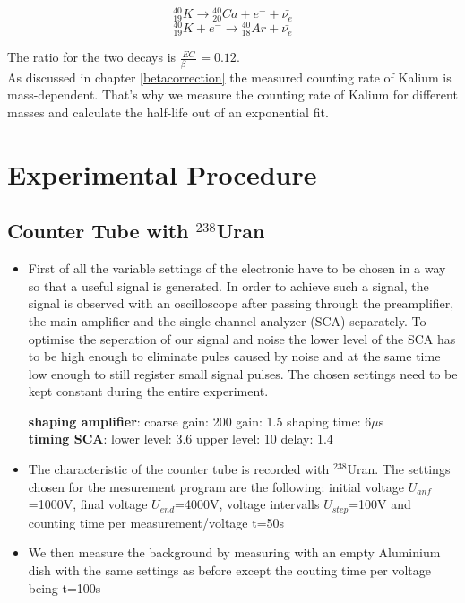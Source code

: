 \documentclass[12pt]{article}
\begin{document}
\[{}^{40}_{19}K \rightarrow {}^{40}_{20}Ca + e^- + \bar{\nu_e}\]
\[{}^{40}_{19}K + e^- \rightarrow {}^{40}_{18}Ar + \bar{\nu_e}\]

The ratio for the two decays is $\frac{EC}{\beta-}=0.12$.\\

As discussed in chapter \ref{betacorrection} the measured counting rate of Kalium is mass-dependent. That's why we measure the counting rate of Kalium for different masses and calculate the half-life out of an exponential fit.

\section{Experimental Procedure}

\subsection{Counter Tube with ${}^{238}$Uran}
\begin{itemize}
	\item First of all the variable settings of the electronic have to be chosen in a way so that a useful signal is generated. In order to achieve such a signal, the signal is observed with an oscilloscope after passing through the preamplifier, the main amplifier and the single channel analyzer (SCA) separately. To optimise the seperation of our signal and noise the lower level of the SCA has to be high enough to eliminate pules caused by noise and at the same time low enough to still register small signal pulses. The chosen settings need to be kept constant during the entire experiment.
	
		\textbf{shaping amplifier}: coarse gain: 200 \hspace{1.5cm} gain: 1.5 \hspace{1cm} shaping time: 6$\mu$s\\
		\textbf{timing SCA}: \hspace{1cm} lower level: 3.6 \hspace{0.5cm} upper level: 10 \hspace{2.5cm} delay: 1.4
	
	\item The characteristic of the counter tube is recorded with ${}^{238}$Uran. The settings chosen for the mesurement program are the following: initial voltage $U_{anf}$=1000V, final voltage $U_{end}$=4000V, voltage intervalls $U_{step}$=100V and counting time per measurement/voltage t=50s
	
	\item We then measure the background by measuring with an empty Aluminium dish with the same settings as before except the couting time per voltage being t=100s
\end{itemize}
\end{document}
